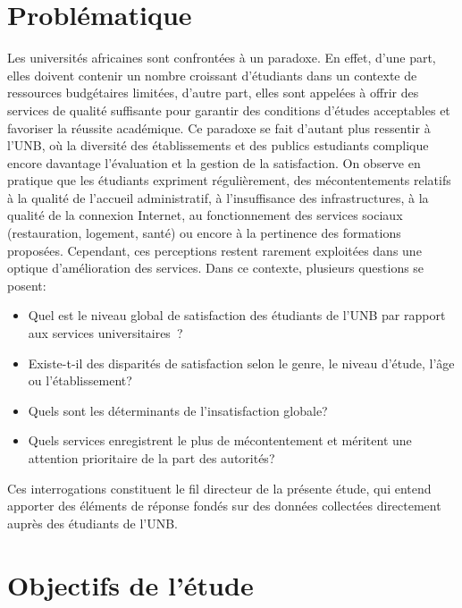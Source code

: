 \documentclass[
12pt,          %
a4paper,       %
oneside,      %
openright      %
]{report}          %
\begin{document}
		
		\section{Problématique }
		\label{sec:problematique}
		
		Les universités africaines sont confrontées à un paradoxe. En effet, d'une part, elles
		doivent contenir un nombre croissant d'étudiants dans un contexte de ressources budgétaires
		limitées, d'autre part, elles sont appelées à offrir des services de qualité suffisante
		pour garantir des conditions d'études acceptables et favoriser la réussite académique. Ce
		paradoxe se fait d'autant plus ressentir à l'UNB, où la diversité des établissements et des publics
		estudiants complique encore davantage l'évaluation et la gestion de la satisfaction.
		On observe en pratique que les étudiants expriment régulièrement, des mécontentements relatifs à la qualité de l'accueil administratif, à l'insuffisance des infrastructures, à la qualité de la connexion Internet, au fonctionnement des services sociaux (restauration, logement, santé) ou encore à la pertinence des formations proposées. Cependant, ces perceptions restent rarement exploitées dans une optique d'amélioration des services.
		Dans ce contexte, plusieurs questions se posent:
		
		\begin{itemize}
			\item Quel est le niveau global de satisfaction des étudiants de l'UNB par rapport aux
			services universitaires~?
			\item Existe-t-il des disparités de satisfaction selon le genre, le niveau d'étude,
			l'âge ou l'établissement?
			\item Quels sont les déterminants de l'insatisfaction globale?
			\item Quels services enregistrent le plus de mécontentement et méritent une attention
			prioritaire de la part des autorités?
		\end{itemize}
		
		Ces interrogations constituent le fil directeur de la présente étude, qui entend apporter
		des éléments de réponse fondés sur des données collectées directement auprès
		des étudiants de l'UNB.
		
		\section{Objectifs de l'étude}
		\label{sec:objectifs}
		
\end{document}
